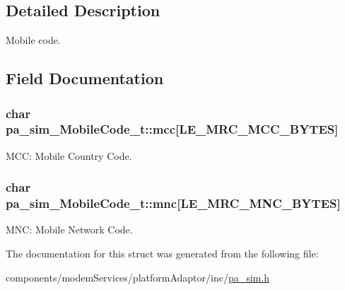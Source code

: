 \subsection{Detailed Description}
Mobile code. 

\subsection{Field Documentation}
\subsubsection[{\texorpdfstring{mcc}{mcc}}]{\setlength{\rightskip}{0pt plus 5cm}char pa\+\_\+sim\+\_\+\+Mobile\+Code\+\_\+t\+::mcc\mbox{[}{\bf L\+E\+\_\+\+M\+R\+C\+\_\+\+M\+C\+C\+\_\+\+B\+Y\+T\+ES}\mbox{]}}\hypertarget{structpa__sim___mobile_code__t_ab5524fbf25b11fe28b8e47e30ad38edf}{}\label{structpa__sim___mobile_code__t_ab5524fbf25b11fe28b8e47e30ad38edf}


M\+CC\+: Mobile Country Code. 

\subsubsection[{\texorpdfstring{mnc}{mnc}}]{\setlength{\rightskip}{0pt plus 5cm}char pa\+\_\+sim\+\_\+\+Mobile\+Code\+\_\+t\+::mnc\mbox{[}{\bf L\+E\+\_\+\+M\+R\+C\+\_\+\+M\+N\+C\+\_\+\+B\+Y\+T\+ES}\mbox{]}}\hypertarget{structpa__sim___mobile_code__t_a151d28fcde13a9b0bb587718d1d27986}{}\label{structpa__sim___mobile_code__t_a151d28fcde13a9b0bb587718d1d27986}


M\+NC\+: Mobile Network Code. 



The documentation for this struct was generated from the following file\+:\begin{DoxyCompactItemize}
\item 
components/modem\+Services/platform\+Adaptor/inc/\hyperlink{pa__sim_8h}{pa\+\_\+sim.\+h}\end{DoxyCompactItemize}
